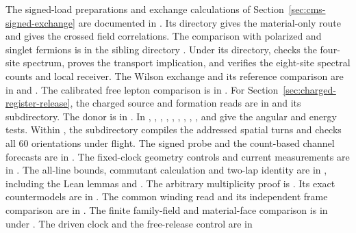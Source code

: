 \documentclass[11pt]{article}
\begin{document}
The signed-load preparations and exchange calculations of
Section~\ref{sec:cms-signed-exchange} are documented in
.
Its  directory gives the
material-only route and  gives the crossed field
correlations. The comparison with polarized and singlet fermions is in the
sibling directory .
Under its  directory,
 checks the four-site spectrum,
 proves the transport implication,
and  verifies the eight-site
spectral counts and local receiver. The Wilson exchange and its reference
comparison are in  and
. The calibrated free lepton comparison
is in .
For Section~\ref{sec:charged-register-release}, the charged source and
formation reads are in 
and its  subdirectory. The donor is in
.
In ,
, , ,
, , ,
, ,  and 
give the angular and energy tests. Within , the
subdirectory  compiles the addressed spatial turns and
 checks all 60 orientations under flight.
The signed probe and the count-based channel forecasts are in
. The fixed-clock geometry controls and current
measurements are in . The all-line bounds, commutant
calculation and two-lap identity are in , including
the Lean lemmas  and .
The arbitrary multiplicity proof is .
Its exact countermodels are in .
The common winding read and its independent frame comparison are in
. The finite family-field and material-face
comparison is in  under
.
The driven clock and the free-release control are in
\end{document}
